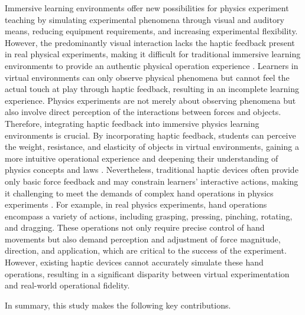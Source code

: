 \documentclass[runningheads]{llncs}
\begin{document}
Immersive learning environments offer new possibilities for physics experiment teaching by simulating experimental phenomena through visual and auditory means, reducing equipment requirements, and increasing experimental flexibility. However, the predominantly visual interaction lacks the haptic feedback present in real physical experiments, making it difficult for traditional immersive learning environments to provide an authentic physical operation experience \cite{giri2021application}. Learners in virtual environments can only observe physical phenomena but cannot feel the actual touch at play through haptic feedback, resulting in an incomplete learning experience. Physics experiments are not merely about observing phenomena but also involve direct perception of the interactions between forces and objects. Therefore, integrating haptic feedback into immersive physics learning environments is crucial. By incorporating haptic feedback, students can perceive the weight, resistance, and elasticity of objects in virtual environments, gaining a more intuitive operational experience and deepening their understanding of physics concepts and laws \cite{minaker2016handson}. Nevertheless, traditional haptic devices often provide only basic force feedback and may constrain learners' interactive actions, making it challenging to meet the demands of complex hand operations in physics experiments \cite{bonfert2023challenges}. For example, in real physics experiments, hand operations encompass a variety of actions, including grasping, pressing, pinching, rotating, and dragging. These operations not only require precise control of hand movements but also demand perception and adjustment of force magnitude, direction, and application, which are critical to the success of the experiment. However, existing haptic devices cannot accurately simulate these hand operations, resulting in a significant disparity between virtual experimentation and real-world operational fidelity.

In summary, this study makes the following key contributions.

\end{document}
